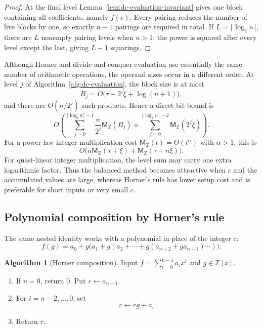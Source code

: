 \documentclass[11pt]{book}
\theoremstyle{definition}
\newtheorem{algorithm}[theorem]{Algorithm}
\newcommand{\ZZ}{\mathbb Z}
\newcommand{\MZ}{\mathsf M_{\ZZ}}
\begin{document}
\begin{proof}
At the final level Lemma~\ref{lem:dc-evaluation-invariant} gives one block
containing all coefficients, namely $f(c)$.  Every pairing reduces the number
of live blocks by one, so exactly $n-1$ pairings are required in total.  If
$L=\lceil\log_2 n\rceil$, there are $L$ nonempty pairing levels when $n>1$;
the power is squared after every level except the last, giving $L-1$
squarings.
\end{proof}

Although Horner and divide-and-conquer evaluation use essentially the same
number of arithmetic operations, the operand sizes occur in a different
order.  At level $j$ of Algorithm~\ref{alg:dc-evaluation}, the block size is
at most
\[
 B_j=O\bigl(\tau+2^j\xi+\log(n+1)\bigr),
\]
and there are $O(n/2^j)$ such products.  Hence a direct bit bound is
\begin{equation}\label{eq:dc-evaluation-bit}
 O\left(
   \sum_{j=0}^{\lceil\log_2 n\rceil-1}
   \frac{n}{2^j}\MZ(B_j)
   +\sum_{j=0}^{\lceil\log_2 n\rceil-2}\MZ(2^j\xi)
 \right).
\end{equation}
For a power-law integer multiplication cost
$\MZ(t)=\Theta(t^\alpha)$ with $\alpha>1$, this is
\[
 O\bigl(n\MZ(\tau+\xi)+\MZ(\tau+n\xi)\bigr).
\]
For quasi-linear integer multiplication, the level sum may carry one extra
logarithmic factor.  Thus the balanced method becomes attractive when $c$ and
the accumulated values are large, whereas Horner's rule has lower setup cost
and is preferable for short inputs or very small $c$.

\subsection{Polynomial composition by Horner's rule}

The same nested identity works with a polynomial in place of the integer
$c$:
\begin{equation}\label{eq:horner-composition}
 f(g)=a_0+g\bigl(a_1+g(a_2+\cdots+g(a_{n-2}+ga_{n-1})\cdots)\bigr).
\end{equation}

\begin{algorithm}[Horner composition]\label{alg:horner-composition}
Input $f=\sum_{i=0}^{n-1}a_ix^i$ and $g\in\ZZ[x]$.
\begin{enumerate}
 \item If $n=0$, return $0$.  Put $r\leftarrow a_{n-1}$.
 \item For $i=n-2,\ldots,0$, set
 \[
     r\leftarrow rg+a_i.
 \]
 \item Return $r$.
\end{enumerate}
\end{algorithm}
\end{document}
